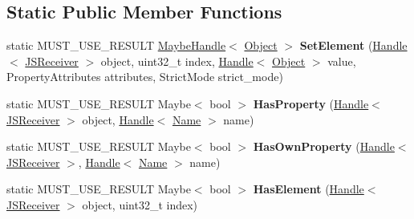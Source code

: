 \subsection*{Static Public Member Functions}
\begin{DoxyCompactItemize}
\item 
\hypertarget{classv8_1_1internal_1_1_j_s_receiver_a4f88f91ac0579f00aea06258e2f10fb9}{}static M\+U\+S\+T\+\_\+\+U\+S\+E\+\_\+\+R\+E\+S\+U\+L\+T \hyperlink{classv8_1_1internal_1_1_maybe_handle}{Maybe\+Handle}$<$ \hyperlink{classv8_1_1internal_1_1_object}{Object} $>$ {\bfseries Set\+Element} (\hyperlink{classv8_1_1internal_1_1_handle}{Handle}$<$ \hyperlink{classv8_1_1internal_1_1_j_s_receiver}{J\+S\+Receiver} $>$ object, uint32\+\_\+t index, \hyperlink{classv8_1_1internal_1_1_handle}{Handle}$<$ \hyperlink{classv8_1_1internal_1_1_object}{Object} $>$ value, Property\+Attributes attributes, Strict\+Mode strict\+\_\+mode)\label{classv8_1_1internal_1_1_j_s_receiver_a4f88f91ac0579f00aea06258e2f10fb9}

\item 
\hypertarget{classv8_1_1internal_1_1_j_s_receiver_af1a2320c78d9be111d0baf12ebde58d1}{}static M\+U\+S\+T\+\_\+\+U\+S\+E\+\_\+\+R\+E\+S\+U\+L\+T Maybe$<$ bool $>$ {\bfseries Has\+Property} (\hyperlink{classv8_1_1internal_1_1_handle}{Handle}$<$ \hyperlink{classv8_1_1internal_1_1_j_s_receiver}{J\+S\+Receiver} $>$ object, \hyperlink{classv8_1_1internal_1_1_handle}{Handle}$<$ \hyperlink{classv8_1_1internal_1_1_name}{Name} $>$ name)\label{classv8_1_1internal_1_1_j_s_receiver_af1a2320c78d9be111d0baf12ebde58d1}

\item 
\hypertarget{classv8_1_1internal_1_1_j_s_receiver_acf3fcfc08ea2419fb3f956fd2bfca4d7}{}static M\+U\+S\+T\+\_\+\+U\+S\+E\+\_\+\+R\+E\+S\+U\+L\+T Maybe$<$ bool $>$ {\bfseries Has\+Own\+Property} (\hyperlink{classv8_1_1internal_1_1_handle}{Handle}$<$ \hyperlink{classv8_1_1internal_1_1_j_s_receiver}{J\+S\+Receiver} $>$, \hyperlink{classv8_1_1internal_1_1_handle}{Handle}$<$ \hyperlink{classv8_1_1internal_1_1_name}{Name} $>$ name)\label{classv8_1_1internal_1_1_j_s_receiver_acf3fcfc08ea2419fb3f956fd2bfca4d7}

\item 
\hypertarget{classv8_1_1internal_1_1_j_s_receiver_a7f7a992ed1a978f2137dbe851175399d}{}static M\+U\+S\+T\+\_\+\+U\+S\+E\+\_\+\+R\+E\+S\+U\+L\+T Maybe$<$ bool $>$ {\bfseries Has\+Element} (\hyperlink{classv8_1_1internal_1_1_handle}{Handle}$<$ \hyperlink{classv8_1_1internal_1_1_j_s_receiver}{J\+S\+Receiver} $>$ object, uint32\+\_\+t index)\label{classv8_1_1internal_1_1_j_s_receiver_a7f7a992ed1a978f2137dbe851175399d}


\end{DoxyCompactItemize}

